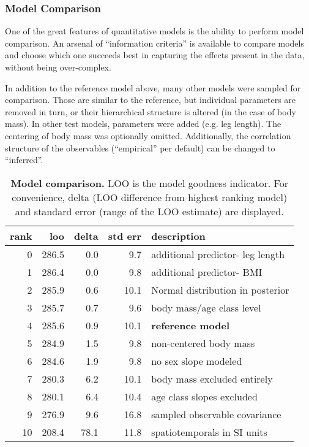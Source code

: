 \subsubsection{Model Comparison}
\label{strides:comparison}
One of the great features of quantitative models is the ability to perform model comparison.
An arsenal of ``information criteria'' is available to compare models and choose which one succeeds best in capturing the effects present in the data, without being over-complex.

In addition to the reference model above, many other models were sampled for comparison.
Those are similar to the reference, but individual parameters are removed in turn, or their hierarchical structure is altered (in the case of body mass).
In other test models, parameters were added (e.g. leg length).
The centering of body mass was optionally omitted.
Additionally, the correlation structure of the observables (``empirical'' per default) can be changed to ``inferred''.

\begin{table}[p]
\caption{\label{tab:stridemodelcomparison}\textbf{Model comparison.} LOO is the model goodness indicator. For convenience, delta (LOO difference from highest ranking model) and standard error (range of the LOO estimate) are displayed.}
\centering
\begin{tabular}{rrrrl}
\textbf{rank} & \textbf{loo} & \textbf{delta} & \textbf{std err} & \textbf{description}\\[0pt]
\hline
0 & 286.5 & 0.0 & 9.7 & additional predictor- leg length\\[0pt]
1 & 286.4 & 0.0 & 9.8 & additional predictor- BMI\\[0pt]
2 & 285.9 & 0.6 & 10.1 & Normal distribution in posterior\\[0pt]
3 & 285.7 & 0.7 & 9.6 & body mass/age class level\\[0pt]
4 & 285.6 & 0.9 & 10.1 & \textbf{reference model}\\[0pt]
5 & 284.9 & 1.5 & 9.8 & non-centered body mass\\[0pt]
6 & 284.6 & 1.9 & 9.8 & no sex slope modeled\\[0pt]
7 & 280.3 & 6.2 & 10.1 & body mass excluded entirely\\[0pt]
8 & 280.1 & 6.4 & 10.4 & age class slopes excluded\\[0pt]
9 & 276.9 & 9.6 & 16.8 & sampled observable covariance\\[0pt]
10 & 208.4 & 78.1 & 11.8 & spatiotemporals in SI units\\[0pt]
\end{tabular}
\end{table}


